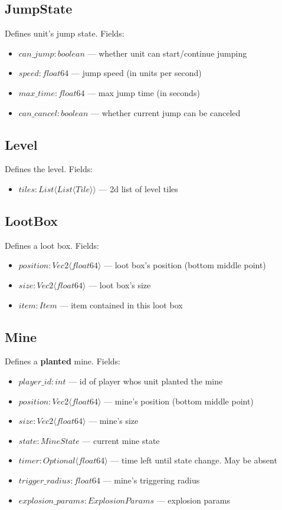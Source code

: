 \subsection{JumpState}
Defines unit's jump state. Fields:
\begin{itemize}
    \item $can\_jump : boolean$ --- whether unit can start/continue jumping
    \item $speed : float64$ --- jump speed (in units per second)
    \item $max\_time : float64$ --- max jump time (in seconds)
    \item $can\_cancel : boolean$ --- whether current jump can be canceled
\end{itemize}

\subsection{Level}
Defines the level. Fields:
\begin{itemize}
    \item $tiles : List \langle List \langle Tile \rangle \rangle$ --- 2d list of level tiles
\end{itemize}

\subsection{LootBox}
Defines a loot box. Fields:
\begin{itemize}
    \item $position : Vec2 \langle float64 \rangle$ --- loot box's position (bottom middle point)
    \item $size : Vec2 \langle float64 \rangle$ --- loot box's size
    \item $item : Item$ --- item contained in this loot box
\end{itemize}

\subsection{Mine}
Defines a \textbf{planted} mine. Fields:
\begin{itemize}
    \item $player\_id : int$ --- id of player whos unit planted the mine
    \item $position : Vec2 \langle float64 \rangle$ --- mine's position (bottom middle point)
    \item $size : Vec2 \langle float64 \rangle$ --- mine's size
    \item $state : MineState$ --- current mine state
    \item $timer : Optional \langle float64 \rangle$ --- time left until state change. May be absent
    \item $trigger\_radius : float64$ --- mine's triggering radius
    \item $explosion\_params : ExplosionParams$ --- explosion params
\end{itemize}

